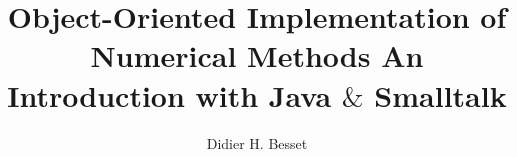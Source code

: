 \documentclass[twoside]{book}
\begin{document}
\title{Object-Oriented Implementation of \linebreak Numerical Methods\linebreak
 An Introduction with Java $\&$ Smalltalk}
\author{Didier H. Besset}
\maketitle {}

{\parskip 0pt \tableofcontents \listoffigures \listoftables
\listoflistings} \cleardoublepage{}












\appendix






\end{document}
